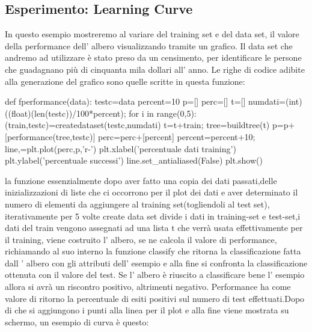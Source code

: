 		\subsection{Esperimento: Learning Curve}
		In questo esempio mostreremo al variare del training set e del data set, il valore della performance dell' albero visualizzando tramite un grafico.
		Il data set che andremo ad utilizzare è stato preso da un censimento, per identificare le persone che guadagnano più di cinquanta mila dollari all' anno.
		Le righe di codice adibite alla generazione del grafico sono quelle scritte in questa funzione:
		\begin{python}
		def fperformance(data):
			testc=data
			percent=10
			p=[]
			perc=[]
			t=[]
			numdati=(int)((float)(len(testc))/100*percent);
			for i in range(0,5):
				(train,testc)=createdataset(testc,numdati)
				t=t+train;
				tree=buildtree(t)
				p=p+[performance(tree,testc)]
				perc=perc+[percent]
				percent=percent+10;
				line,=plt.plot(perc,p,'r-')
			plt.xlabel('percentuale dati training')
			plt.ylabel('percentuale successi')
			line.set_antialiased(False)
			plt.show()
		\end{python}
		\bigskip
		la funzione essenzialmente dopo aver fatto una copia dei dati passati,delle inizializzazioni di liste che ci occorrono per il plot dei dati e aver determinato il numero di elementi da aggiungere al training set(togliendoli al test set), iterativamente per 5 volte create data set divide i dati in training-set e test-set,i dati del train vengono assegnati ad una lista t che verrà usata effettivamente per il training, viene costruito l' albero, se ne calcola il valore di performance, richiamando al suo interno la funzione classify che ritorna la classificazione fatta dall ' albero con gli attributi dell' esempio e alla fine si confronta la classificazione ottenuta con il valore del test. Se l' albero è riuscito a classificare bene l' esempio allora si avrà un riscontro positivo, altrimenti negativo. Performance  ha come valore di ritorno la percentuale di esiti positivi sul numero di test effettuati.Dopo di che si aggiungono i punti alla linea per il plot e alla fine viene mostrata su schermo, un esempio di curva è questo:
